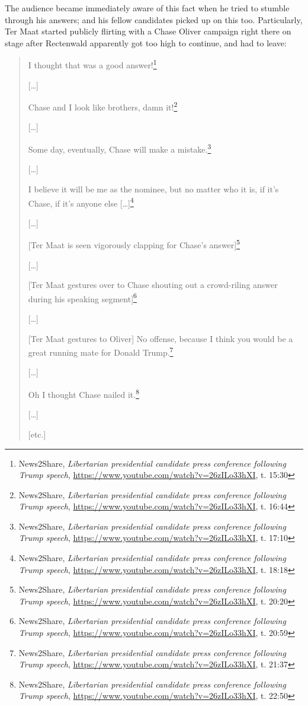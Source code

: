 \documentclass[11pt]{article}
\begin{document}
The audience became immediately aware of this fact when he tried to stumble through his answers; and his fellow candidates picked up on this too. Particularly, Ter Maat started publicly flirting with a Chase Oliver campaign right there on stage after Rectenwald apparently got too high to continue, and had to leave:
\begin{quote}
I thought that was a good answer!\footnote{News2Share, \emph{Libertarian presidential candidate press conference following Trump speech}, \url{https://www.youtube.com/watch?v=26zILo33hXI}, t. 15:30}

{[}\ldots{}]

Chase and I look like brothers, damn it!\footnote{News2Share, \emph{Libertarian presidential candidate press conference following Trump speech}, \url{https://www.youtube.com/watch?v=26zILo33hXI}, t. 16:44}

{[}\ldots{}]

Some day, eventually, Chase will make a mistake.\footnote{News2Share, \emph{Libertarian presidential candidate press conference following Trump speech}, \url{https://www.youtube.com/watch?v=26zILo33hXI}, t. 17:10}

{[}\ldots{}]

I believe it will be me as the nominee, but no matter who it is, if it's Chase, if it's anyone else [\ldots{}]\footnote{News2Share, \emph{Libertarian presidential candidate press conference following Trump speech}, \url{https://www.youtube.com/watch?v=26zILo33hXI}, t. 18:18}

{[}\ldots{}]

{[}Ter Maat is seen vigorously clapping for Chase's answer]\footnote{News2Share, \emph{Libertarian presidential candidate press conference following Trump speech}, \url{https://www.youtube.com/watch?v=26zILo33hXI}, t. 20:20}

{[}\ldots{}]

{[}Ter Maat gestures over to Chase shouting out a crowd-riling answer during his speaking segment]\footnote{News2Share, \emph{Libertarian presidential candidate press conference following Trump speech}, \url{https://www.youtube.com/watch?v=26zILo33hXI}, t. 20:59}

{[}\ldots{}]

{[}Ter Maat gestures to Oliver] No offense, because I think you would be a great running mate for Donald Trump.\footnote{News2Share, \emph{Libertarian presidential candidate press conference following Trump speech}, \url{https://www.youtube.com/watch?v=26zILo33hXI}, t. 21:37}

{[}\ldots{}]

Oh I thought Chase nailed it.\footnote{News2Share, \emph{Libertarian presidential candidate press conference following Trump speech}, \url{https://www.youtube.com/watch?v=26zILo33hXI}, t. 22:50}

{[}\ldots{}]

{[}etc.]
\end{quote}
\end{document}
